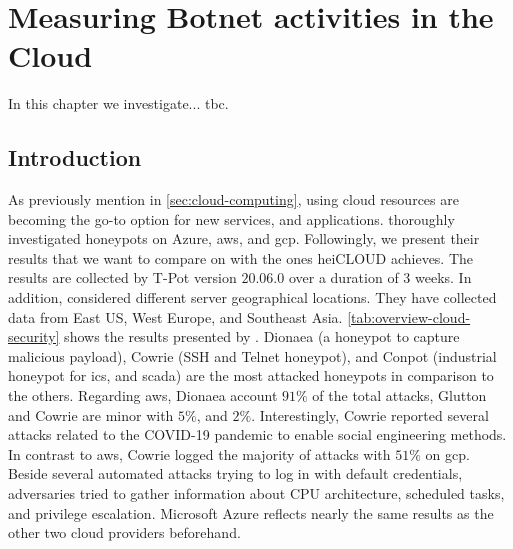 \chapter{Measuring Botnet activities in the Cloud}

In this chapter we investigate... tbc.

\section{Introduction}

As previously mention in \autoref{sec:cloud-computing}, using cloud resources are becoming the go-to option for new services, and applications.
\citet{Kelly2021} thoroughly investigated honeypots on Azure, \ac{aws}, and \ac{gcp}.
Followingly, we present their results that we want to compare on with the ones heiCLOUD achieves.
The results are collected by T-Pot version $20.06.0$ over a duration of 3 weeks.
In addition, \citet{Kelly2021} considered different server geographical locations.
They have collected data from East US, West Europe, and Southeast Asia.
\autoref{tab:overview-cloud-security} shows the results presented by \citet{Kelly2021}.
Dionaea (a honeypot to capture malicious payload), Cowrie (SSH and Telnet honeypot), and Conpot (industrial honeypot for \acs{ics}, and \acs{scada}) are the most attacked honeypots in comparison to the others.
Regarding \ac{aws}, Dionaea account $91\%$ of the total attacks, Glutton and Cowrie are minor with $5\%$, and $2\%$.
Interestingly, Cowrie reported several attacks related to the COVID-19 pandemic to enable social engineering methods.
In contrast to \ac{aws}, Cowrie logged the majority of attacks with $51\%$ on \ac{gcp}.
Beside several automated attacks trying to log in with default credentials, adversaries tried to gather information about CPU architecture, scheduled tasks, and privilege escalation.
Microsoft Azure reflects nearly the same results as the other two cloud providers beforehand.

